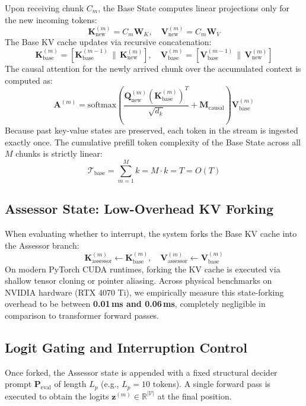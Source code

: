 \documentclass{article}
\begin{document}
Upon receiving chunk $C_m$, the Base State computes linear projections only for the new incoming tokens:
\begin{equation}
\mathbf{K}_{\text{new}}^{(m)} = C_m \mathbf{W}_K, \quad \mathbf{V}_{\text{new}}^{(m)} = C_m \mathbf{W}_V
\end{equation}
The Base KV cache updates via recursive concatenation:
\begin{equation}
\mathbf{K}_{\text{base}}^{(m)} = \left[ \mathbf{K}_{\text{base}}^{(m-1)} \,\|\, \mathbf{K}_{\text{new}}^{(m)} \right], \quad 
\mathbf{V}_{\text{base}}^{(m)} = \left[ \mathbf{V}_{\text{base}}^{(m-1)} \,\|\, \mathbf{V}_{\text{new}}^{(m)} \right]
\end{equation}
The causal attention for the newly arrived chunk over the accumulated context is computed as:
\begin{equation}
\mathbf{A}^{(m)} = \text{softmax}\left( \frac{\mathbf{Q}_{\text{new}}^{(m)} (\mathbf{K}_{\text{base}}^{(m)})^T}{\sqrt{d_k}} + \mathbf{M}_{\text{causal}} \right) \mathbf{V}_{\text{base}}^{(m)}
\end{equation}
Because past key-value states are preserved, each token in the stream is ingested exactly once. The cumulative prefill token complexity of the Base State across all $M$ chunks is strictly linear:
\begin{equation}
\mathcal{T}_{\text{base}} = \sum_{m=1}^M k = M \cdot k = T = O(T)
\end{equation}

\subsection{Assessor State: Low-Overhead KV Forking}
When evaluating whether to interrupt, the system forks the Base KV cache into the Assessor branch:
\begin{equation}
\mathbf{K}_{\text{assessor}}^{(m)} \leftarrow \mathbf{K}_{\text{base}}^{(m)}, \quad 
\mathbf{V}_{\text{assessor}}^{(m)} \leftarrow \mathbf{V}_{\text{base}}^{(m)}
\end{equation}
On modern PyTorch CUDA runtimes, forking the KV cache is executed via shallow tensor cloning or pointer aliasing. Across physical benchmarks on NVIDIA hardware (RTX 4070 Ti), we empirically measure this state-forking overhead to be between \textbf{0.01\,ms and 0.06\,ms}, completely negligible in comparison to transformer forward passes.

\subsection{Logit Gating and Interruption Control}
Once forked, the Assessor state is appended with a fixed structural decider prompt $\mathbf{P}_{\text{eval}}$ of length $L_p$ (e.g., $L_p = 10$ tokens). A single forward pass is executed to obtain the logits $\mathbf{z}^{(m)} \in \mathbb{R}^{|\mathcal{V}|}$ at the final position.
\end{document}
